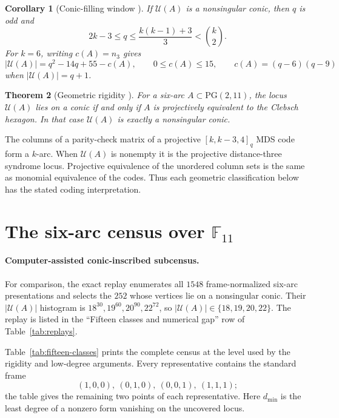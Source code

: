 \documentclass[11pt]{article}
\newtheorem{theorem}{Theorem}[section]
\newtheorem{corollary}[theorem]{Corollary}
\theoremstyle{remark}
\newcommand{\PG}{\mathrm{PG}}
\newcommand{\F}{\mathbb{F}}
\newcommand{\cU}{\mathcal{U}}
\begin{document}
\begin{corollary}[Conic-filling window
{\cite[Corollary 3.2]{RuddRigidity2026}}]
\label{cor:conic-filling-window}
If $\cU(A)$ is a nonsingular conic, then $q$ is odd and
\[
 2k-3\le q\le\frac{k(k-1)+3}{3}<\binom{k}{2}.
\]
For $k=6$, writing $c(A)=n_3$ gives
\[
 |\cU(A)|=q^2-14q+55-c(A),\qquad
 0\le c(A)\le15,\qquad
 c(A)=(q-6)(q-9)
\]
when $|\cU(A)|=q+1$.
\end{corollary}

\begin{theorem}[Geometric rigidity
{\cite[Theorem 1.1]{RuddRigidity2026}}]
\label{thm:rigidity}
For a six-arc $A\subset\PG(2,11)$, the locus $\cU(A)$ lies on a conic if
and only if $A$ is projectively equivalent to the Clebsch hexagon.  In that
case $\cU(A)$ is exactly a nonsingular conic.
\end{theorem}

The columns of a parity-check matrix of a projective
$[k,k-3,4]_q$ MDS code form a $k$-arc.  When $\cU(A)$ is nonempty it is
the projective distance-three syndrome locus.  Projective equivalence of
the unordered column sets is the same as monomial equivalence of the
codes.  Thus each geometric classification below has the stated coding
interpretation.

\section{The six-arc census over \texorpdfstring{$\F_{11}$}{F11}}

\paragraph{Computer-assisted conic-inscribed subcensus.}
For comparison, the exact replay enumerates all $1548$ frame-normalized
six-arc presentations and selects the $252$ whose vertices lie on a
nonsingular conic. Their $|\cU(A)|$ histogram is
$18^{30},19^{60},20^{90},22^{72}$, so
$|\cU(A)|\in\{18,19,20,22\}$. The replay is listed in the ``Fifteen
classes and numerical gap'' row of Table~\ref{tab:replays}.

Table~\ref{tab:fifteen-classes} prints the complete census at the level
used by the rigidity and low-degree arguments.  Every representative
contains the standard frame
\[
 (1,0,0),\ (0,1,0),\ (0,0,1),\ (1,1,1);
\]
the table gives the remaining two points of each representative.
Here $d_{\min}$ is the least degree of a nonzero form vanishing on the
uncovered locus.
\end{document}
